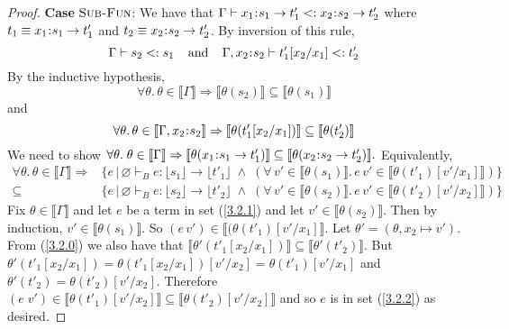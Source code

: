 \documentclass[11pt]{article}
\newcommand{\bind}{\hspace{0.05em}{:}\hspace{0.05em}} %
\newcommand{\lb}{\llbracket}         %
\newcommand{\rb}{\rrbracket}         %
\begin{document}
\begin{proof}
{\bf Case} $\textsc{Sub-Fun}$: We have that
$\Gamma \vdash x_1\bind s_1 \rightarrow t'_1 <: x_2\bind s_2 \rightarrow t'_2$ where $t_1 \equiv x_1\bind s_1 \rightarrow t'_1$ and $t_2 \equiv x_2\bind s_2 \rightarrow t'_2$. By inversion of this rule,
\[
\Gamma \vdash s_2 <: s_1 \;\;\;\;{\rm and}\;\;\;\;
\Gamma,x_2\bind s_2 \vdash t'_1[x_2/x_1] <: t'_2
\]
By the inductive hypothesis,
\[
\forall\theta.\, \theta \in \lb\Gamma\rb \Rightarrow
\lb\theta(s_2)\rb \subseteq\lb\theta(s_1)\rb 
\]
and
\begin{equation}\label{3.2.0}
\forall\theta.\, \theta \in \lb\Gamma, x_2\bind s_2\rb \Rightarrow
\lb\theta(t'_1[x_2/x_1])\rb \subseteq\lb\theta(t'_2)\rb 
\end{equation}
We need to show $\forall \theta.\; 
\theta \in \lb \Gamma \rb \Rightarrow 
\lb\theta(x_1\bind s_1\rightarrow t'_1)\rb \subseteq \lb\theta(x_2\bind s_2\rightarrow t'_2)\rb.$
Equivalently,
\begin{align} \label{3.2.1}
\forall\theta.\,\theta\in\lb\Gamma\rb \Rightarrow&
\{ e \,|\, \varnothing \vdash_B e:\lfloor s_1\rfloor \rightarrow \lfloor t'_1\rfloor \;\wedge\; 
  (\forall\, v' \in \lb \theta(s_1)\rb.\, e\,v' \in\lb \theta(t'_1)[v'/x_1]\rb)\}\\
\subseteq &\{ e \,|\, \varnothing \vdash_B e:\lfloor s_2\rfloor \rightarrow \lfloor t'_2\rfloor \;\wedge\; 
  (\forall\, v' \in \lb \theta(s_2)\rb.\, e\,v' \in\lb \theta(t'_2)[v'/x_2]\rb)\}\label{3.2.2} 
\end{align}
Fix $\theta \in \lb\Gamma\rb$ and let $e$ be a term in set (\ref{3.2.1}) and let $v' \in \lb \theta(s_2)\rb$. Then by induction, $v' \in \lb \theta(s_1)\rb$. So $(e\, v') \in \lb(\theta(t'_1)[v'/x_1]\rb$. Let $\theta' = (\theta, x_2 \mapsto v')$.  From (\ref{3.2.0}) we also have that 
$\lb\theta'(t'_1[x_2/x_1])\rb \subseteq \lb\theta'(t'_2)\rb$.
But $\theta'(t'_1[x_2/x_1]) = \theta(t'_1[x_2/x_1])[v'/x_2] = \theta(t'_1)[v'/x_1]$ and $\theta'(t'_2) = \theta(t'_2)[v'/x_2]$.
Therefore  $(e\; v') \in \lb \theta(t'_1)[v'/x_2]\rb \subseteq \lb \theta(t'_2)[v'/x_2]\rb$ and so $e$ is in set (\ref{3.2.2}) as desired.


\end{proof}
\end{document}
